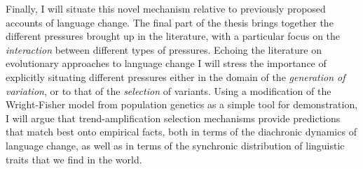 Finally, I will situate this novel mechanism relative to previously proposed accounts of language change. The final part of the thesis brings together the different pressures brought up in the literature, with a particular focus on the \emph{interaction} between different types of pressures. Echoing the literature on evolutionary approaches to language change I will stress the importance of explicitly situating different pressures either in the domain of the \emph{generation of variation}, or to that of the \emph{selection} of variants. Using a modification of the Wright-Fisher model from population genetics as a simple tool for demonstration, I will argue that trend-amplification selection mechanisms provide predictions that match best onto empirical facts, both in terms of the diachronic dynamics of language change, as well as in terms of the synchronic distribution of linguistic traits that we find in the world.

